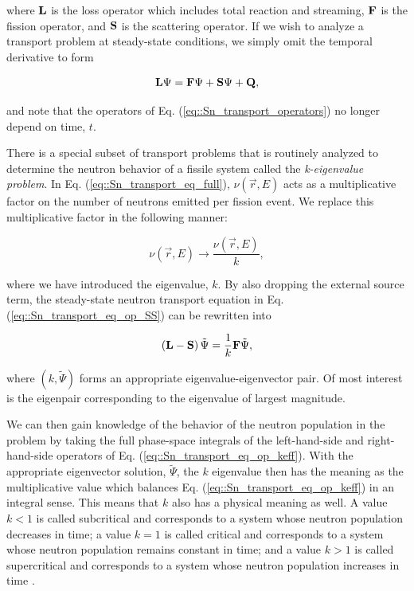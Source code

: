 \noindent where ${\bf L}$ is the loss operator which includes total reaction and streaming, ${\bf F}$ is the fission operator, and ${\bf S}$ is the scattering operator. If we wish to analyze a transport problem at steady-state conditions, we simply omit the temporal derivative to form

\begin{equation}
\label{eq::Sn_transport_eq_op_SS}
	 {\bf L} \Psi =  {\bf F} \Psi  + {\bf S} \Psi + {\bf Q},
\end{equation}

\noindent and note that the operators of Eq. (\ref{eq::Sn_transport_operators}) no longer depend on time, $t$.

There is a special subset of transport problems that is routinely analyzed to determine the neutron behavior of a fissile system called the {\em k-eigenvalue problem}. In Eq. (\ref{eq::Sn_transport_eq_full}), $\nu (\vec{r}, E)$ acts as a multiplicative factor on the number of neutrons emitted per fission event. We replace this multiplicative factor in the following manner:

\begin{equation}
\label{eq::Sn_nubar_k}
	\nu (\vec{r}, E) \rightarrow \frac{{\nu} (\vec{r}, E)}{k},
\end{equation}

\noindent where we have introduced the eigenvalue, $k$. By also dropping the external source term, the steady-state neutron transport equation in Eq. (\ref{eq::Sn_transport_eq_op_SS}) can be rewritten into

\begin{equation}
\label{eq::Sn_transport_eq_op_keff}
	\left( {\bf L}  - {\bf S} \right) \tilde{\Psi} =  \frac{1}{k} {\bf F} \tilde{\Psi} ,
\end{equation}

\noindent where $(k, \tilde{\Psi})$ forms an appropriate eigenvalue-eigenvector pair. Of most interest is the eigenpair corresponding to the eigenvalue of largest magnitude.

We can then gain knowledge of the behavior of the neutron population in the problem by taking the full phase-space integrals of the left-hand-side and right-hand-side operators of Eq. (\ref{eq::Sn_transport_eq_op_keff}). With the appropriate eigenvector solution, $\tilde{\Psi}$, the $k$ eigenvalue then has the meaning as the multiplicative value which balances Eq. (\ref{eq::Sn_transport_eq_op_keff}) in an integral sense. This means that $k$ also has a physical meaning as well. A value $k<1$ is called subcritical and corresponds to a system whose neutron population decreases in time; a value $k=1$ is called critical and corresponds to a system whose neutron population remains constant in time; and a value $k>1$ is called supercritical and corresponds to a system whose neutron population increases in time \cite{ott1989}.


